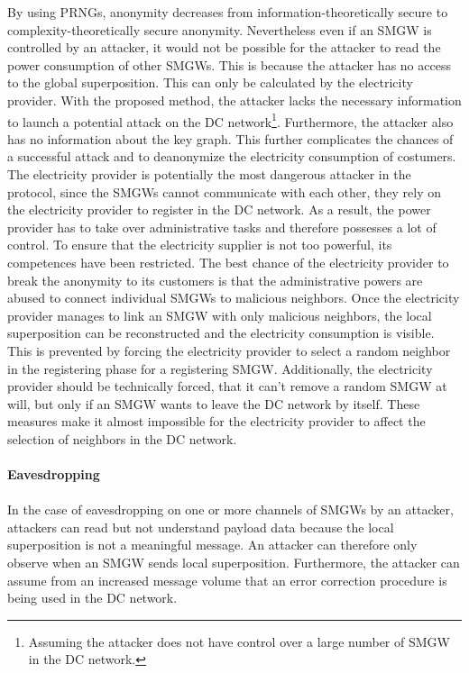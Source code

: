 By using \gls{PRNG}s, anonymity decreases from information-theoretically secure to complexity-theoretically secure anonymity. Nevertheless even if an \gls{SMGW} is controlled by an attacker, it would not be possible for the attacker to read the power consumption of other \gls{SMGW}s. This is because the attacker has no access to the global superposition. This can only be calculated by the electricity provider. With the proposed method, the attacker lacks the necessary information to launch a potential attack on the DC network\footnote[6]{Assuming the attacker does not have control over a large number of \gls{SMGW} in the DC network.}. Furthermore, the attacker also has no information about the key graph. This further complicates the chances of a successful attack and to deanonymize the electricity consumption of costumers. The electricity provider is potentially the most dangerous attacker in the protocol, since the \gls{SMGW}s cannot communicate with each other, they rely on the electricity provider to register in the DC network. As a result, the power provider has to take over administrative tasks and therefore possesses a lot of control. To ensure that the electricity supplier is not too powerful, its competences have been restricted. The best chance of the electricity provider to break the anonymity to its customers is that the administrative powers are abused to connect individual \gls{SMGW}s to malicious neighbors. Once the electricity provider manages to link an \gls{SMGW} with only malicious neighbors, the local superposition can be reconstructed and the electricity consumption is visible. This is prevented by forcing the electricity provider to select a random neighbor in the registering phase for a registering \gls{SMGW}. Additionally, the electricity provider should be technically forced, that it can't remove a random \gls{SMGW} at will, but only if an \gls{SMGW} wants to leave the DC network by itself. These measures make it almost impossible for the electricity provider to affect the selection of neighbors in the DC network.
\\
\\
\textbf{Eavesdropping}
\\
\\
In the case of eavesdropping on one or more channels of \gls{SMGW}s by an attacker, attackers can read but not understand payload data because the local superposition is not a meaningful message. An attacker can therefore only observe when an \gls{SMGW} sends local superposition. Furthermore, the attacker can assume from an increased message volume that an error correction procedure is being used in the DC network. 

